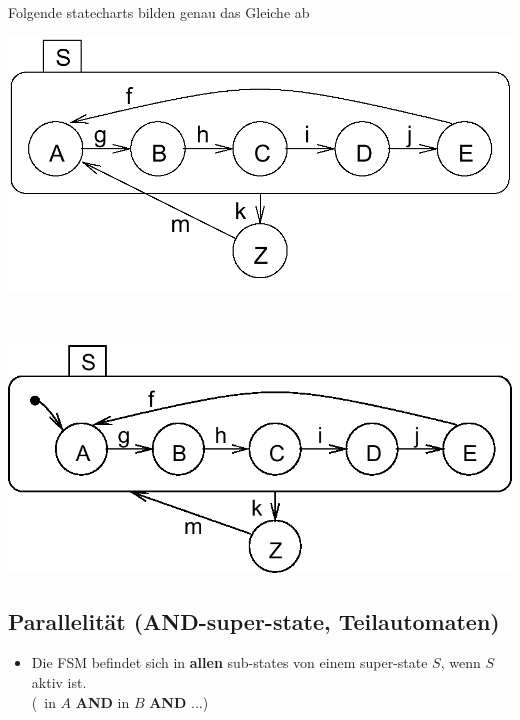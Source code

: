 Folgende statecharts bilden genau das Gleiche ab

\vspace{0.2cm}

\begin{minipage}[c]{0.41\columnwidth}
    \includegraphics[width=\columnwidth]{images/statechart_hierarchie.png}
\end{minipage}
\hfill
\begin{minipage}[c]{0.07\columnwidth}
    \begin{center}
        \huge \textlrarrow\
    \end{center}
\end{minipage}
\hfill
\begin{minipage}[c]{0.41\columnwidth}
    \includegraphics[width=\columnwidth]{images/statechart_default_state.png}
\end{minipage}


\subsection{Parallelität (AND-super-state, Teilautomaten)}

\begin{itemize}
    \item Die FSM befindet sich in \textbf{allen} sub-states von einem super-state $S$, wenn $S$ aktiv ist.\\
        (\textrightarrow\ in $A$ \textbf{AND} in $B$ \textbf{AND} ...)
\end{itemize}

